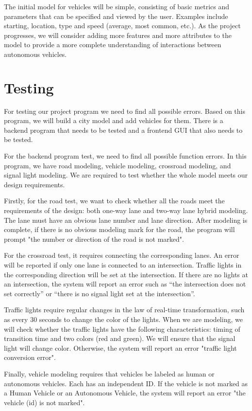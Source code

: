 \documentclass[onecolumn, draftclsnofoot,10pt, compsoc]{IEEEtran}
\begin{document}
The initial model for vehicles will be simple, consisting of basic metrics and parameters that can be specified and viewed by the user.
Examples include starting, location, type and speed (average, most common, etc.).
As the project progresses, we will consider adding more features and more attributes to the model to provide a more complete understanding of interactions between autonomous vehicles.
\section{Testing}
For testing our project program we need to find all possible errors.
Based on this program, we will build a city model and add vehicles for them.
There is a backend program that needs to be tested and a frontend GUI that also needs to be tested.

For the backend program test, we need to find all possible function errors.
In this program, we have road modeling, vehicle modeling, crossroad modeling, and signal light modeling.
We are required to test whether the whole model meets our design requirements. 

Firstly, for the road test, we want to check whether all the roads meet the requirements of the design: both one-way lane and two-way lane hybrid modeling.
The lane must have an obvious lane number and lane direction.
After modeling is complete, if there is no obvious modeling mark for the road, the program will prompt "the number or direction of the road is not marked".

For the crossroad test, it requires connecting the corresponding lanes.
An error will be reported if only one lane is connected to an intersection.
Traffic lights in the corresponding direction will be set at the intersection.
If there are no lights at an intersection, the system will report an error such as “the intersection does not set correctly” or “there is no signal light set at the intersection”.

Traffic lights require regular changes in the law of real-time transformation, such as every 30 seconds to change the color of the lights.
When we are modeling, we will check whether the traffic lights have the following characteristics: timing of transition time and two colors (red and green).
We will ensure that the signal light will change color.
Otherwise, the system will report an error "traffic light conversion error".

Finally, vehicle modeling requires that vehicles be labeled as human or autonomous vehicles.
Each has an independent ID.
If the vehicle is not marked as a Human Vehicle or an Autonomous Vehicle, the system will report an error "the vehicle (id) is not marked". 
\end{document}
